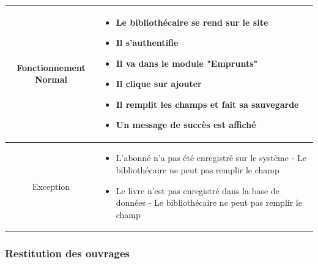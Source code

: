 \par 
\begin{tabular}{|c|p{7cm}|}
        \hline
        Fonctionnement Normal & \begin{itemize}
                \item Le bibliothécaire se rend sur le site
                \item Il s'authentifie
                \item Il va dans le module "Emprunts"
                \item Il clique sur ajouter
                \item Il remplit les champs et fait sa sauvegarde
                \item Un message de succès est affiché
        \end{itemize} \\
        \hline
        Exception & \begin{itemize}
                \item L'abonné n'a pas été enregistré sur le système - Le bibliothécaire ne peut pas remplir le champ
                \item Le livre n'est pas enregistré dans la base de données - Le bibliothécaire ne peut pas remplir le champ
        \end{itemize} \\
        \hline
\end{tabular}


\subsubsection{Restitution des ouvrages} 

